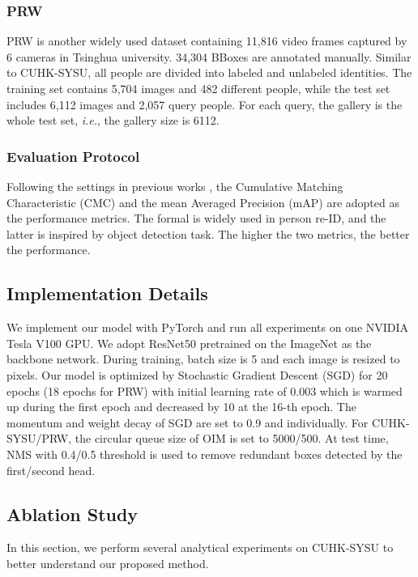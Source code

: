 \documentclass[letterpaper]{article} \usepackage{aaai21}  \usepackage{times}  \usepackage{helvet} \usepackage{courier}  \usepackage[hyphens]{url}  \usepackage{graphicx} \urlstyle{rm} \def\UrlFont{\rm}  \usepackage{natbib}  \usepackage{caption} \usepackage{multirow}
\begin{document}
\subsubsection{PRW}
PRW is another widely used dataset \cite{prw} containing 11,816 video frames captured by 6 cameras in Tsinghua university. 34,304 BBoxes are annotated manually. Similar to CUHK-SYSU, all people are divided into labeled and unlabeled identities. The training set contains 5,704 images and 482 different people, while the test set includes 6,112 images and 2,057 query people. For each query, the gallery is the whole test set, \textit{i.e.}, the gallery size is 6112.

\subsubsection{Evaluation Protocol}
Following the settings in previous works \cite{qeeps,nae}, the Cumulative Matching Characteristic (CMC) and the mean Averaged Precision (mAP) are adopted as the performance metrics. The formal is widely used in person re-ID, and the latter is inspired by object detection task. The higher the two metrics, the better the performance.

\subsection{Implementation Details}
We implement our model with PyTorch \cite{pytorch} and run all experiments on one NVIDIA Tesla V100 GPU. We adopt ResNet50 \cite{resnet} pretrained on the ImageNet \cite{imagenet} as the backbone network. During training, batch size is 5 and each image is resized to  pixels. Our model is optimized by Stochastic Gradient Descent (SGD) for 20 epochs (18 epochs for PRW) with initial learning rate of 0.003 which is warmed up during the first epoch and decreased by 10 at the 16-th epoch. The momentum and weight decay of SGD are set to 0.9 and  individually. For CUHK-SYSU/PRW, the circular queue size of OIM is set to 5000/500. At test time, NMS with 0.4/0.5 threshold is used to remove redundant boxes detected by the first/second head.

\subsection{Ablation Study}
In this section, we perform several analytical experiments on CUHK-SYSU to better understand our proposed method.
\end{document}
